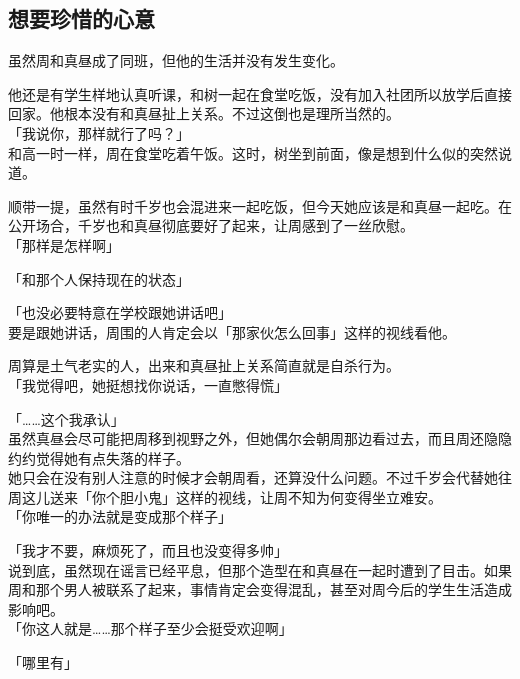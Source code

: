 \subsection{想要珍惜的心意}

虽然周和真昼成了同班，但他的生活并没有发生变化。

他还是有学生样地认真听课，和树一起在食堂吃饭，没有加入社团所以放学后直接回家。他根本没有和真昼扯上关系。不过这倒也是理所当然的。\\

「我说你，那样就行了吗？」\\

和高一时一样，周在食堂吃着午饭。这时，树坐到前面，像是想到什么似的突然说道。

顺带一提，虽然有时千岁也会混进来一起吃饭，但今天她应该是和真昼一起吃。在公开场合，千岁也和真昼彻底要好了起来，让周感到了一丝欣慰。\\

「那样是怎样啊」

「和那个人保持现在的状态」

「也没必要特意在学校跟她讲话吧」\\

要是跟她讲话，周围的人肯定会以「那家伙怎么回事」这样的视线看他。

周算是土气老实的人，出来和真昼扯上关系简直就是自杀行为。\\

「我觉得吧，她挺想找你说话，一直憋得慌」

「……这个我承认」\\

虽然真昼会尽可能把周移到视野之外，但她偶尔会朝周那边看过去，而且周还隐隐约约觉得她有点失落的样子。\\

她只会在没有别人注意的时候才会朝周看，还算没什么问题。不过千岁会代替她往周这儿送来「你个胆小鬼」这样的视线，让周不知为何变得坐立难安。\\

「你唯一的办法就是变成那个样子」

「我才不要，麻烦死了，而且也没变得多帅」\\

说到底，虽然现在谣言已经平息，但那个造型在和真昼在一起时遭到了目击。如果周和那个男人被联系了起来，事情肯定会变得混乱，甚至对周今后的学生生活造成影响吧。\\

「你这人就是……那个样子至少会挺受欢迎啊」

「哪里有」\\

